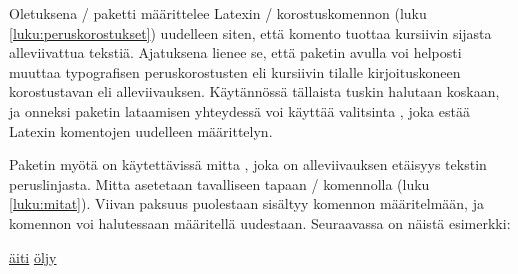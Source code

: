 
Oletuksena \-/ paketti määrittelee Latexin
\-/ korostuskomennon (luku \ref{luku:peruskorostukset})
uudelleen siten, että komento tuottaa kursiivin sijasta alleviivattua
tekstiä. Ajatuksena lienee se, että paketin avulla voi helposti muuttaa
typografisen peruskorostusten eli kursiivin tilalle kirjoituskoneen
korostustavan eli alleviivauksen. Käytännössä tällaista tuskin halutaan
koskaan, ja onneksi paketin lataamisen yhteydessä voi käyttää valitsinta
, joka estää Latexin komentojen uudelleen
määrittelyn.

\begin{koodilohkosis}
\usepackage[normalem]{ulem}
\end{koodilohkosis}

Paketin  myötä on käytettävissä mitta ,
joka on alleviivauksen etäisyys tekstin peruslinjasta. Mitta asetetaan
tavalliseen tapaan \-/ komennolla (luku
\ref{luku:mitat}). Viivan paksuus puolestaan sisältyy komennon
 määritelmään, ja komennon voi halutessaan
määritellä uudestaan. Seuraavassa on näistä esimerkki:

\begin{koodilohkosis}
\setlength{\ULdepth}{.2ex}        %
\renewcommand{\ULthickness}{.1ex} %
\uline{äiti} \uline{öljy}
\end{koodilohkosis}

